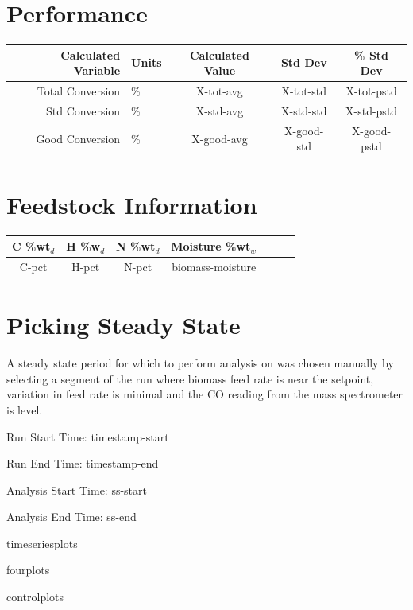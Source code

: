 \documentclass[11pt]{article}
\begin{document}
\section*{Performance}

\begin{table}[hb]
\centering
\begin{tabular}{r l c c c}
	Calculated Variable	& Units		& Calculated Value		& Std Dev		& \% Std Dev	\\
\hline 	Total Conversion	& \%			& X-tot-avg			& X-tot-std		& X-tot-pstd		\\
	Std Conversion	& \%			& X-std-avg			& X-std-std		& X-std-pstd		\\
	Good Conversion	& \%			& X-good-avg		& X-good-std		& X-good-pstd	\\
\end{tabular}
\end{table}

\newpage

\vspace{-4ex}
\section*{Feedstock Information}
\vspace{-2ex}

\begin{table}[h]
\centering
\begin{tabular}{c c c c c c c}
	C \%wt$_{d}$	& H \%w$_{d}$	& N \%wt$_{d}$	& Moisture \%wt$_{w}$		\\
\hline 	C-pct			& H-pct			& N-pct			& biomass-moisture		\\
\end{tabular}
\end{table}


\section*{Picking Steady State}

A steady state period for which to perform analysis on was chosen manually by selecting a segment of the run where biomass feed rate is near the setpoint, variation in feed rate is minimal and the CO reading from the mass spectrometer is level.

Run Start Time: timestamp-start 

Run End Time: timestamp-end  

Analysis Start Time: ss-start 

Analysis End Time: ss-end 

\centering
\clearpage
timeseriesplots 
\clearpage
\newpage

fourplots 
\clearpage
\newpage

controlplots 
\clearpage
\end{document}
